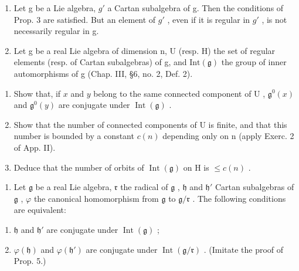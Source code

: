 
\begin{enumerate}
\def\labelenumi{\arabic{enumi})}
\item
  Let g be a Lie algebra, \(g'\) a Cartan subalgebra of g. Then the conditions of Prop. 3 are satisfied. But an element of \(g'\) , even if it is regular in \(g'\) , is not necessarily regular in g.
\item
  Let g be a real Lie algebra of dimension n, U (resp. H) the set of regular elements (resp. of Cartan subalgebras) of g, and \(\text{Int}(\mathfrak{g})\) the group of inner automorphisms of g (Chap. III, §6, no. 2, Def. 2).
\end{enumerate}

\begin{enumerate}
\def\labelenumi{\alph{enumi})}
\item
  Show that, if \(x\) and \(y\) belong to the same connected component of \(\mathrm{U}\) , \(\mathfrak{g}^0(x)\) and \(\mathfrak{g}^0(y)\) are conjugate under \(\operatorname{Int}(\mathfrak{g})\) .
\item
  Show that the number of connected components of U is finite, and that this number is bounded by a constant \(c(n)\) depending only on n (apply Exerc. 2 of App. II).
\item
  Deduce that the number of orbits of \(\operatorname{Int}(\mathfrak{g})\) on \(\mathrm{H}\) is \(\leq c(n)\) .
\end{enumerate}

\begin{enumerate}
\def\labelenumi{\arabic{enumi})}
\setcounter{enumi}{2}
\tightlist
\item
  Let \(\mathfrak{g}\) be a real Lie algebra, \(\mathfrak{r}\) the radical of \(\mathfrak{g}\) , \(\mathfrak{h}\) and \(\mathfrak{h}'\) Cartan subalgebras of \(\mathfrak{g}\) , \(\varphi\) the canonical homomorphism from \(\mathfrak{g}\) to \(\mathfrak{g} / \mathfrak{r}\) . The following conditions are equivalent:
\end{enumerate}

\begin{enumerate}
\def\labelenumi{(\roman{enumi})}
\item
  \(\mathfrak{h}\) and \(\mathfrak{h}'\) are conjugate under \(\operatorname{Int}(\mathfrak{g})\) ;
\item
  \(\varphi(\mathfrak{h})\) and \(\varphi(\mathfrak{h}')\) are conjugate under \(\operatorname{Int}(\mathfrak{g}/\mathfrak{r})\) . (Imitate the proof of Prop. 5.)
\end{enumerate}

